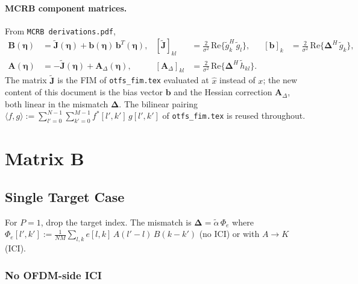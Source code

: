 \documentclass[11pt]{article}
\begin{document}
\paragraph{MCRB component matrices.} From \texttt{MCRB derivations.pdf},
\begin{align}
    \bm{B}(\bm{\eta}) &= \tilde{\bm{J}}(\bm{\eta}) + \bm{b}(\bm{\eta})\, \bm{b}^T(\bm{\eta}), &
    [\tilde{\bm{J}}]_{kl} &= \tfrac{2}{\sigma^2}\, \mathrm{Re}\{\tilde{g}_k^H\, \tilde{g}_l\}, &
    [\bm{b}]_k &= \tfrac{2}{\sigma^2}\, \mathrm{Re}\{\bm{\Delta}^H\, \tilde{g}_k\}, \\
    \bm{A}(\bm{\eta}) &= -\tilde{\bm{J}}(\bm{\eta}) + \bm{A}_\Delta(\bm{\eta}), &
    [\bm{A}_\Delta]_{kl} &= \tfrac{2}{\sigma^2}\, \mathrm{Re}\{\bm{\Delta}^H\, \tilde{h}_{kl}\}. & &
\end{align}
The matrix \(\tilde{\bm{J}}\) is the FIM of \texttt{otfs\_fim.tex} evaluated at \(\hat{x}\) instead of \(x\); the new content of this document is the bias vector \(\bm{b}\) and the Hessian correction \(\bm{A}_\Delta\), both linear in the mismatch \(\bm{\Delta}\). The bilinear pairing \(\langle f, g \rangle := \sum_{l'=0}^{N-1}\sum_{k'=0}^{M-1} f^*[l',k']\, g[l',k']\) of \texttt{otfs\_fim.tex} is reused throughout.

\section{Matrix B}

\subsection{Single Target Case}

For \(P=1\), drop the target index. The mismatch is \(\bm{\Delta} = \tilde{\alpha}\, \Phi_e\) where \(\Phi_e[l',k'] := \tfrac{1}{NM}\sum_{l,k} e[l,k]\, A(l'-l)\, B(k-k')\) (no ICI) or with \(A \to K\) (ICI).

\subsubsection{No OFDM-side ICI}
\end{document}
